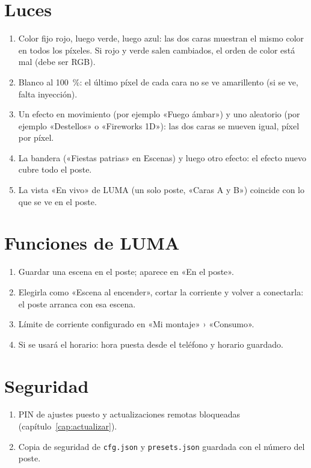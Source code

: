 \section{Luces}
\begin{enumerate}[resume]
\item Color fijo rojo, luego verde, luego azul: las dos caras muestran el mismo color en todos los píxeles. Si rojo y verde salen cambiados, el orden de color está mal (debe ser RGB).
\item Blanco al 100~\%: el último píxel de cada cara no se ve amarillento (si se ve, falta inyección).
\item Un efecto en movimiento (por ejemplo «Fuego ámbar») y uno aleatorio (por ejemplo «Destellos» o «Fireworks 1D»): las dos caras se mueven igual, píxel por píxel.
\item La bandera («Fiestas patrias» en Escenas) y luego otro efecto: el efecto nuevo cubre todo el poste.
\item La vista «En vivo» de LUMA (un solo poste, «Caras A y B») coincide con lo que se ve en el poste.
\end{enumerate}

\section{Funciones de LUMA}
\begin{enumerate}[resume]
\item Guardar una escena en el poste; aparece en «En el poste».
\item Elegirla como «Escena al encender», cortar la corriente y volver a conectarla: el poste arranca con esa escena.
\item Límite de corriente configurado en «Mi montaje» › «Consumo».
\item Si se usará el horario: hora puesta desde el teléfono y horario guardado.
\end{enumerate}

\section{Seguridad}
\begin{enumerate}[resume]
\item PIN de ajustes puesto y actualizaciones remotas bloqueadas (capítulo~\ref{cap:actualizar}).
\item Copia de seguridad de \texttt{cfg.json} y \texttt{presets.json} guardada con el número del poste.
\end{enumerate}


